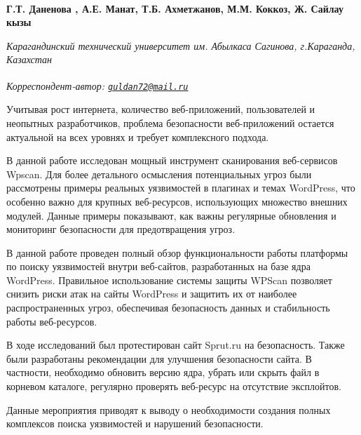 
\begin{articleheader}

{\bfseries
Г.Т. Даненова\textsuperscript{\envelope } \authorid,
А.Е. Манат\authorid,
Т.Б. Ахметжанов\authorid,
М.М. Коккоз\authorid,
Ж. Сайлау кызы\authorid}
\end{articleheader}

\begin{affiliation}
\emph{Карагандинский технический университет им. Абылкаса Сагинова, г.Караганда, Казахстан}

\raggedright \textsuperscript{\envelope }{\em Корреспондент-автор: \href{mailto:guldan72@mail.ru}{\nolinkurl{guldan72@mail.ru}}}
\end{affiliation}

Учитывая рост интернета, количество веб-приложений, пользователей и
неопытных разработчиков, проблема безопасности веб-приложений остается
актуальной на всех уровнях и требует комплексного подхода.

В данной работе исследован мощный инструмент сканирования веб-сервисов
Wpscan. Для более детального осмысления потенциальных угроз были
рассмотрены примеры реальных уязвимостей в плагинах и темах WordPress,
что особенно важно для крупных веб-ресурсов, использующих множество
внешних модулей. Данные примеры показывают, как важны регулярные
обновления и мониторинг безопасности для предотвращения угроз.

В данной работе проведен полный обзор функциональности работы платформы
по поиску уязвимостей внутри веб-сайтов, разработанных на базе ядра
WordPress. Правильное использование системы защиты WPScan позволяет
снизить риски атак на сайты WordPress и защитить их от наиболее
распространенных угроз, обеспечивая безопасность данных и стабильность
работы веб-ресурсов.

В ходе исследований был протестирован сайт Sprut.ru на безопасность.
Также были разработаны рекомендации для улучшения безопасности сайта. В
частности, необходимо обновить версию ядра, убрать или скрыть файл в
корневом каталоге, регулярно проверять веб-ресурс на отсутствие
эксплойтов.

Данные мероприятия приводят к выводу о необходимости создания полных
комплексов поиска уязвимостей и нарушений безопасности.

